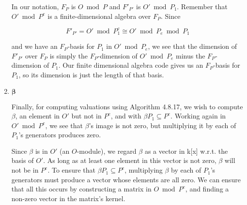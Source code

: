 \documentclass{article}
\begin{document}
\begin{enumerate}
In our notation, $F_P$ is $O \bmod P$ and $F'_{P'}$ is $O' \bmod P_1$.
Remember that $O' \bmod P^e$ is a finite-dimensional algebra over
$F_P$.  Since

$$F'_{P'} = O' \bmod P_1^c \cong O' \bmod P_e \bmod P_1$$

and we have an $F_P$-basis for $P_1$ in $O' \bmod P_e$, we see that the
dimension of $F'_{P'}$ over $F_P$ is simply the $F_P$-dimension of $O' \bmod P_e$
minus the $F_P$-dimension of $P_1$.  Our finite dimensional algebra
code gives us an $F_P$-basis for $P_1$, so its dimension is just
the length of that basis.

\item $\boldsymbol{\beta}$

Finally, for computing valuations using \cite{cohen} Algorithm 4.8.17,
we wish to compute $\beta$, an element in $O'$ but not in $P^e$, and
with $\beta P_1 \subseteq P^e$.  Working again in $O' \bmod P^e$,
we see that $\beta$'s image is not zero, but multiplying it
by each of $P_1$'s generators produces zero.

Since $\beta$ is in $O'$ (an $O$-module), we regard $\beta$ as
a vector in k[x] w.r.t. the basis of $O'$.  As long as
at least one element in this vector is not zero,
$\beta$ will not be in $P^e$.  To ensure that
$\beta P_1 \subseteq P^e$, multiplying $\beta$ by each of $P_1$'s
generators must produce a vector whose elements are all zero.
We can ensure that all this
occurs by constructing a matrix in $O \bmod P^e$,
and finding a non-zero vector in
the matrix's kernel.

\end{enumerate}
\end{document}

